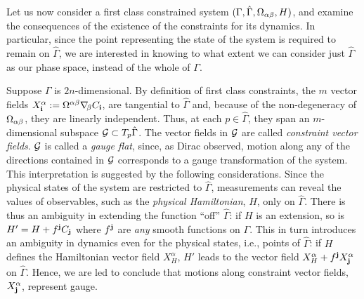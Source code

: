 Let us now consider a first class constrained system $(\Gamma,\hat\Gamma,
\Omega_{\alpha\beta},H)$, and examine the consequences of the existence of the
constraints for its dynamics. In particular, since the point representing the
state of the system is required to remain on $\hat\Gamma$, we are interested
in knowing to what extent we can consider just $\hat\Gamma$ as our phase
space, instead of the whole of $\Gamma$.

Suppose $\Gamma$ is $2n$-dimensional. By definition of first class
constraints, the $m$ vector fields $X_{\bf i}^\alpha:=\Omega^{{\alpha\beta}}
\nabla\!_\beta C_{\bf i}$, are tangential to $\hat\Gamma$ and, because of the
non-degeneracy of $\Omega_{\alpha\beta}$, they are linearly independent. Thus, at each
$p\in\hat\Gamma$, they span an $m$-dimensional subspace ${\cal G}\subset
T_p\hat\Gamma$. The vector fields in ${\cal G}$ are called {\it constraint
vector fields}. ${\cal G}$ is called a {\it gauge flat}, since, as Dirac
observed, motion along any of the directions contained in ${\cal G}$
corresponds to a gauge transformation of the system. This interpretation is
suggested by the following considerations. Since the physical states of the
system are restricted to $\hat\Gamma$, measurements can reveal the values of
observables, such as the {\it physical Hamiltonian}, $H$, only on $\hat\Gamma$.
There is thus an ambiguity in extending the function ``off'' $\hat\Gamma$: if
$H$ is an extension, so is $H'= H+ f^{\bf j}C_{\bf j}$ where $f^{\bf j}$ are
{\it any} smooth functions on $\Gamma$. This in turn introduces an ambiguity
in dynamics even for the physical states, i.e., points of $\hat\Gamma$: if $H$
defines the Hamiltonian vector field $X_H^\alpha$, $H'$ leads to the vector
field $X_H^\alpha + f^{\bf j}X^\alpha_{\bf j}$ on $\hat\Gamma$. Hence, we are
led to conclude that motions along constraint vector fields,
$X_{\bf j}^\alpha$, represent gauge.

